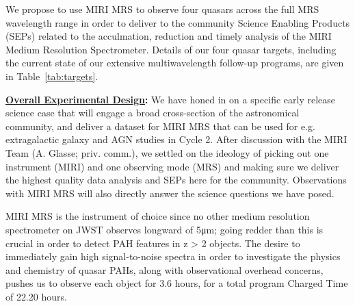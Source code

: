 \smallskip \smallskip
\noindent
We propose to use MIRI MRS to observe four quasars across the full MRS
wavelength range in order to deliver to the community Science Enabling
Products (SEPs) related to the acculmation, reduction and timely
analysis of the MIRI Medium Resolution Spectrometer. Details of our
four quasar targets, including the current state of our extensive
multiwavelength follow-up programs, are given in
Table~\ref{tab:targets}.


\smallskip \smallskip
\noindent
{\bf \underline{Overall Experimental Design}:} 
We have honed in on a specific early release science case that will
engage a broad cross-section of the astronomical community, and
deliver a dataset for MIRI MRS that can be used for e.g. extragalactic
galaxy and AGN studies in Cycle 2.  After discussion with the MIRI
Team (A. Glasse; priv. comm.), we settled on the ideology of picking
out one instrument (MIRI) and one observing mode (MRS) and making sure
we deliver the highest quality data analysis and SEPs here for the
community. Observations with MIRI MRS will also directly answer the
science questions we have posed.

\smallskip \smallskip
\noindent
MIRI MRS is the instrument of choice since no other medium resolution
spectrometer on JWST observes longward of 5μm; going redder than this
is crucial in order to detect PAH features in z > 2 objects. The
desire to immediately gain high signal-to-noise spectra in order to
investigate the physics and chemistry of quasar PAHs, along with
observational overhead concerns, pushes us to observe each object for
3.6 hours, for a total program Charged Time of 22.20 hours.


